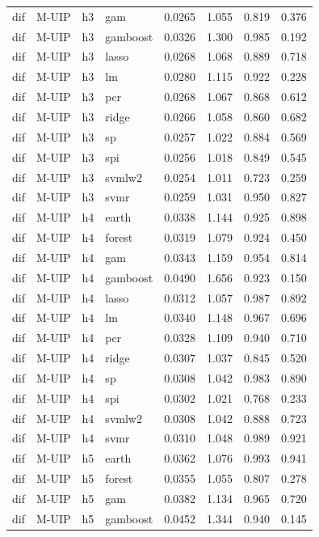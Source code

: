 \begin{ThreePartTable}
\begin{longtable}[t]{llclcccc}
dif & M-UIP & h3 & gam & 0.0265 & 1.055 & 0.819 & 0.376\\
dif & M-UIP & h3 & gamboost & 0.0326 & 1.300 & 0.985 & 0.192\\
dif & M-UIP & h3 & lasso & 0.0268 & 1.068 & 0.889 & 0.718\\
dif & M-UIP & h3 & lm & 0.0280 & 1.115 & 0.922 & 0.228\\
dif & M-UIP & h3 & pcr & 0.0268 & 1.067 & 0.868 & 0.612\\
dif & M-UIP & h3 & ridge & 0.0266 & 1.058 & 0.860 & 0.682\\
dif & M-UIP & h3 & sp & 0.0257 & 1.022 & 0.884 & 0.569\\
dif & M-UIP & h3 & spi & 0.0256 & 1.018 & 0.849 & 0.545\\
dif & M-UIP & h3 & svmlw2 & 0.0254 & 1.011 & 0.723 & 0.259\\
dif & M-UIP & h3 & svmr & 0.0259 & 1.031 & 0.950 & 0.827\\
\addlinespace
dif & M-UIP & h4 & earth & 0.0338 & 1.144 & 0.925 & 0.898\\
dif & M-UIP & h4 & forest & 0.0319 & 1.079 & 0.924 & 0.450\\
dif & M-UIP & h4 & gam & 0.0343 & 1.159 & 0.954 & 0.814\\
dif & M-UIP & h4 & gamboost & 0.0490 & 1.656 & 0.923 & 0.150\\
dif & M-UIP & h4 & lasso & 0.0312 & 1.057 & 0.987 & 0.892\\
dif & M-UIP & h4 & lm & 0.0340 & 1.148 & 0.967 & 0.696\\
dif & M-UIP & h4 & pcr & 0.0328 & 1.109 & 0.940 & 0.710\\
dif & M-UIP & h4 & ridge & 0.0307 & 1.037 & 0.845 & 0.520\\
dif & M-UIP & h4 & sp & 0.0308 & 1.042 & 0.983 & 0.890\\
dif & M-UIP & h4 & spi & 0.0302 & 1.021 & 0.768 & 0.233\\
dif & M-UIP & h4 & svmlw2 & 0.0308 & 1.042 & 0.888 & 0.723\\
dif & M-UIP & h4 & svmr & 0.0310 & 1.048 & 0.989 & 0.921\\
\addlinespace
dif & M-UIP & h5 & earth & 0.0362 & 1.076 & 0.993 & 0.941\\
dif & M-UIP & h5 & forest & 0.0355 & 1.055 & 0.807 & 0.278\\
dif & M-UIP & h5 & gam & 0.0382 & 1.134 & 0.965 & 0.720\\
dif & M-UIP & h5 & gamboost & 0.0452 & 1.344 & 0.940 & 0.145\\

\end{longtable}
\end{ThreePartTable}
